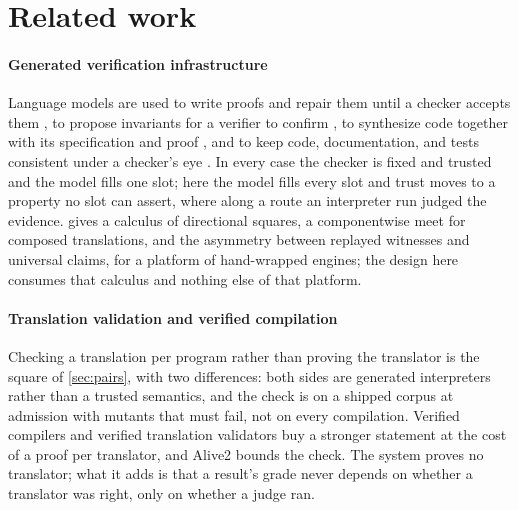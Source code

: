
\section{Related work}
\label{sec:related}

\paragraph{Generated verification infrastructure}
Language models are used to write proofs and repair them until a
checker accepts them
\citep{first2023baldur,yang2023leandojo,yang2025autoverus}, to
propose invariants for a verifier to confirm
\citep{pei2023invariants,wu2024lemur}, to synthesize code together
with its specification and proof
\citep{misu2024dafny,aggarwal2025alphaverus}, and to keep code,
documentation, and tests consistent under a checker's eye
\citep{sun2024clover}. In every case
the checker is fixed and trusted and the model fills one slot; here
the model fills every slot and trust moves to a property no slot can
assert, where along a route an interpreter run judged the evidence. \citet{hurdygurdy2026preprint} gives a calculus
of directional squares, a componentwise meet for composed
translations, and the asymmetry between replayed witnesses and
universal claims, for a platform of hand-wrapped engines; the design
here consumes that calculus and nothing else of that platform.

\paragraph{Translation validation and verified compilation}
Checking a translation per program rather than proving the translator
\citep{pnueli1998tv,necula2000tv} is the square of \cref{sec:pairs},
with two differences: both sides are generated interpreters rather
than a trusted semantics, and the check is on a shipped corpus at
admission with mutants that must fail, not on every compilation.
Verified compilers \citep{leroy2009compcert,kumar2014cakeml} and
verified translation validators \citep{tristan2008tv,sewell2013tv}
buy a stronger statement at the cost of a proof per translator, and
Alive2 \citep{lopes2021alive2} bounds the check. The system proves no
translator; what it adds is
that a result's grade never depends on whether a translator was
right, only on whether a judge ran.

